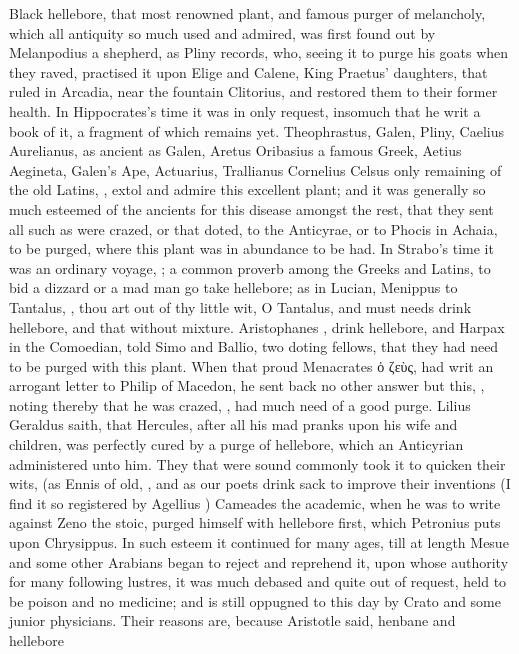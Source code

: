 {Black hellebore, that most renowned plant, and famous purger of melancholy, which all antiquity so much used and admired, was first found out by Melanpodius a shepherd, as Pliny records,  who, seeing it to purge his goats when they raved, practised it upon Elige and Calene, King Praetus' daughters, that ruled in Arcadia, near the fountain Clitorius, and restored them to their former health. In Hippocrates's time it was in only request, insomuch that he writ a book of it, a fragment of which remains yet. Theophrastus, Galen, Pliny, Caelius Aurelianus, as ancient as Galen,  Aretus  Oribasius  a famous Greek, Aetius  Aegineta, Galen's Ape,  Actuarius, Trallianus  Cornelius Celsus only remaining of the old Latins, , extol and admire this excellent plant; and it was generally so much esteemed of the ancients for this disease amongst the rest, that they sent all such as were crazed, or that doted, to the Anticyrae, or to Phocis in Achaia, to be purged, where this plant was in abundance to be had. In Strabo's time it was an ordinary voyage, ; a common proverb among the Greeks and Latins, to bid a dizzard or a mad man go take hellebore; as in Lucian, Menippus to Tantalus, , thou art out of thy little wit, O Tantalus, and must needs drink hellebore, and that without mixture. Aristophanes , drink hellebore, \etc{} and Harpax in the Comoedian, told Simo and Ballio, two doting fellows, that they had need to be purged with this plant. When that proud Menacrates \textgreek[variant=ancient]{ὀ ζεὺς}, had writ an arrogant letter to Philip of Macedon, he sent back no other answer but this, , noting thereby that he was crazed, , had much need of a good purge. Lilius Geraldus saith, that Hercules, after all his mad pranks upon his wife and children, was perfectly cured by a purge of hellebore, which an Anticyrian administered unto him. They that were sound commonly took it to quicken their wits, (as Ennis of old, , and as our poets drink sack to improve their inventions (I find it so registered by Agellius ) Cameades the academic, when he was to write against Zeno the stoic, purged himself with hellebore first, which Petronius puts upon Chrysippus. In such esteem it continued for many ages, till at length Mesue and some other Arabians began to reject and reprehend it, upon whose authority for many following lustres, it was much debased and quite out of request, held to be poison and no medicine; and is still oppugned to this day by Crato and some junior physicians. Their reasons are, because Aristotle  said, henbane and hellebore }
